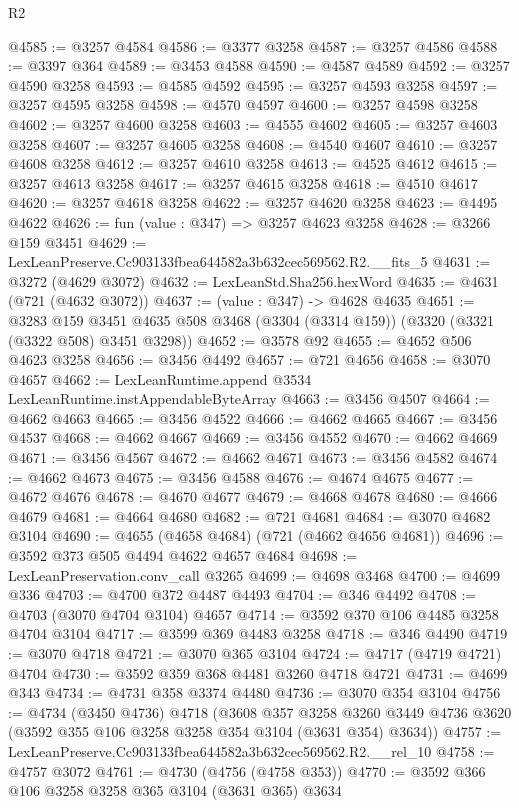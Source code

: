\begin{lexlean}{R2}
\begin{coremodule}
@4585 := @3257 @4584
@4586 := @3377 @3258
@4587 := @3257 @4586
@4588 := @3397 @364
@4589 := @3453 @4588
@4590 := @4587 @4589
@4592 := @3257 @4590 @3258
@4593 := @4585 @4592
@4595 := @3257 @4593 @3258
@4597 := @3257 @4595 @3258
@4598 := @4570 @4597
@4600 := @3257 @4598 @3258
@4602 := @3257 @4600 @3258
@4603 := @4555 @4602
@4605 := @3257 @4603 @3258
@4607 := @3257 @4605 @3258
@4608 := @4540 @4607
@4610 := @3257 @4608 @3258
@4612 := @3257 @4610 @3258
@4613 := @4525 @4612
@4615 := @3257 @4613 @3258
@4617 := @3257 @4615 @3258
@4618 := @4510 @4617
@4620 := @3257 @4618 @3258
@4622 := @3257 @4620 @3258
@4623 := @4495 @4622
@4626 := fun (value : @347) => @3257 @4623 @3258
@4628 := @3266 @159 @3451
@4629 := LexLeanPreserve.Cc903133fbea644582a3b632cec569562.R2.__fits_5
@4631 := @3272 (@4629 @3072)
@4632 := LexLeanStd.Sha256.hexWord
@4635 := @4631 (@721 (@4632 @3072))
@4637 := (value : @347) -> @4628 @4635
@4651 := @3283
    @159
    @3451
    @4635
    @508
    @3468
    (@3304 (@3314 @159))
    (@3320 (@3321 (@3322 @508) @3451 @3298))
@4652 := @3578 @92
@4655 := @4652 @506 @4623 @3258
@4656 := @3456 @4492
@4657 := @721 @4656
@4658 := @3070 @4657
@4662 := LexLeanRuntime.append @3534 LexLeanRuntime.instAppendableByteArray
@4663 := @3456 @4507
@4664 := @4662 @4663
@4665 := @3456 @4522
@4666 := @4662 @4665
@4667 := @3456 @4537
@4668 := @4662 @4667
@4669 := @3456 @4552
@4670 := @4662 @4669
@4671 := @3456 @4567
@4672 := @4662 @4671
@4673 := @3456 @4582
@4674 := @4662 @4673
@4675 := @3456 @4588
@4676 := @4674 @4675
@4677 := @4672 @4676
@4678 := @4670 @4677
@4679 := @4668 @4678
@4680 := @4666 @4679
@4681 := @4664 @4680
@4682 := @721 @4681
@4684 := @3070 @4682 @3104
@4690 := @4655 (@4658 @4684) (@721 (@4662 @4656 @4681))
@4696 := @3592 @373 @505 @4494 @4622 @4657 @4684
@4698 := LexLeanPreservation.conv_call @3265
@4699 := @4698 @3468
@4700 := @4699 @336
@4703 := @4700 @372 @4487 @4493
@4704 := @346 @4492
@4708 := @4703 (@3070 @4704 @3104) @4657
@4714 := @3592 @370 @106 @4485 @3258 @4704 @3104
@4717 := @3599 @369 @4483 @3258
@4718 := @346 @4490
@4719 := @3070 @4718
@4721 := @3070 @365 @3104
@4724 := @4717 (@4719 @4721) @4704
@4730 := @3592 @359 @368 @4481 @3260 @4718 @4721
@4731 := @4699 @343
@4734 := @4731 @358 @3374 @4480
@4736 := @3070 @354 @3104
@4756 := @4734
    (@3450 @4736)
    @4718
    (@3608
      @357
      @3258
      @3260
      @3449
      @4736
      @3620
      (@3592 @355 @106 @3258 @3258 @354 @3104 (@3631 @354) @3634))
@4757 := LexLeanPreserve.Cc903133fbea644582a3b632cec569562.R2.__rel_10
@4758 := @4757 @3072
@4761 := @4730 (@4756 (@4758 @353))
@4770 := @3592 @366 @106 @3258 @3258 @365 @3104 (@3631 @365) @3634

\end{coremodule}
\end{lexlean}
